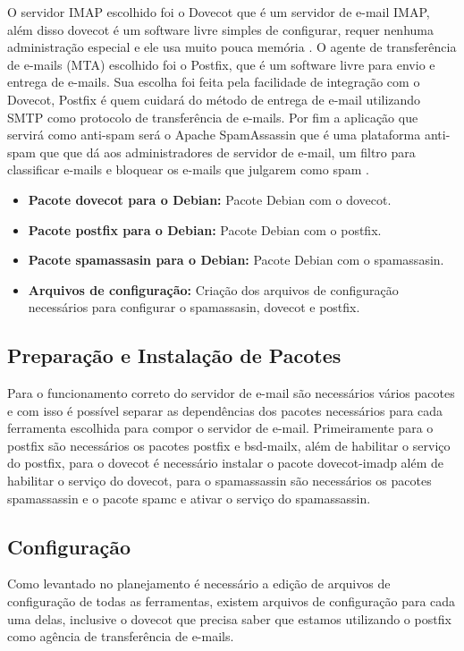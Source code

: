 O servidor IMAP escolhido foi o Dovecot que é um servidor de e-mail
IMAP, além disso dovecot é um software livre simples de configurar, requer nenhuma
administração especial e ele usa muito pouca memória \cite{dovecot}. O agente
de transferência de e-mails (MTA) escolhido foi o Postfix, que é um software
livre para envio e entrega de e-mails. Sua escolha foi feita pela facilidade de
integração com o Dovecot, Postfix é quem cuidará do método de entrega de e-mail
utilizando SMTP como protocolo de transferência de e-mails. Por fim a aplicação
que servirá como anti-spam será o Apache SpamAssassin que é uma plataforma anti-spam
que que dá aos administradores de servidor de e-mail, um filtro para classificar
 e-mails e bloquear os e-mails que julgarem como spam \cite{spam}.

\begin{itemize}
   \item \textbf{Pacote dovecot para o Debian:} Pacote Debian com o dovecot.
   \item \textbf{Pacote postfix para o Debian:} Pacote Debian com o postfix.
   \item \textbf{Pacote spamassasin para o Debian:} Pacote Debian com o spamassasin.
   \item \textbf{Arquivos de configuração:} Criação dos arquivos de configuração
   necessários para configurar o spamassasin, dovecot e postfix.
\end{itemize}

\subsection{Preparação e Instalação de Pacotes }

Para o funcionamento correto do servidor de e-mail são necessários vários pacotes
e com isso é possível separar as dependências dos pacotes necessários para cada ferramenta
escolhida para compor o servidor de e-mail. Primeiramente para o postfix são necessários
os pacotes postfix e bsd-mailx, além de habilitar o serviço do postfix, para o dovecot
é necessário instalar o pacote dovecot-imadp além de habilitar o serviço do dovecot,
para o spamassassin são necessários os pacotes spamassassin e o pacote spamc e ativar
o serviço do spamassassin.

\subsection{Configuração}

Como levantado no planejamento é necessário a edição de arquivos de configuração
de todas as ferramentas, existem arquivos de configuração para cada uma delas, inclusive
o dovecot que precisa saber que estamos utilizando o postfix como agência de transferência
de e-mails.

